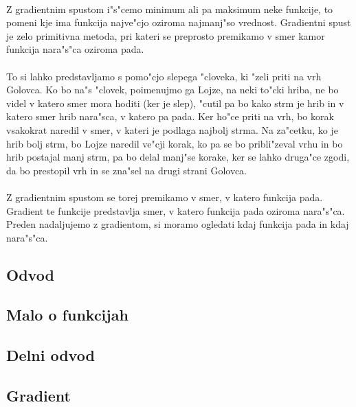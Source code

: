 \paragraph{}
Z gradientnim spustom i"s"cemo minimum ali pa maksimum neke funkcije, to pomeni kje ima funkcija najve"cjo oziroma najmanj"so vrednost. Gradientni spust je zelo primitivna metoda, pri kateri se preprosto premikamo v smer kamor funkcija nara"s"ca oziroma pada.

\paragraph{}
To si lahko predstavljamo s pomo"cjo slepega "cloveka, ki "zeli priti na vrh Golovca. Ko bo na"s "clovek, poimenujmo ga Lojze, na neki to"cki hriba, ne bo videl v katero smer mora hoditi (ker je slep), "cutil pa bo kako strm je hrib in v katero smer hrib nara"sca, v katero pa pada. Ker ho"ce priti na vrh, bo korak vsakokrat naredil v smer, v kateri je podlaga najbolj strma. Na za"cetku, ko je hrib bolj strm, bo Lojze naredil ve"cji korak, ko pa se bo pribli"zeval vrhu in bo hrib postajal manj strm, pa bo delal manj"se korake, ker se lahko druga"ce zgodi, da bo prestopil vrh in se zna"sel na drugi strani Golovca.

\paragraph{}
Z gradientnim spustom se torej premikamo v smer, v katero funkcija pada. Gradient te funkcije predstavlja smer, v katero funkcija pada oziroma nara"s"ca. Preden nadaljujemo z gradientom, si moramo ogledati kdaj funkcija pada in kdaj nara"s"ca.

\subsection*{Odvod}


\subsection*{Malo o funkcijah}


\subsection*{Delni odvod}


\subsection*{Gradient}


